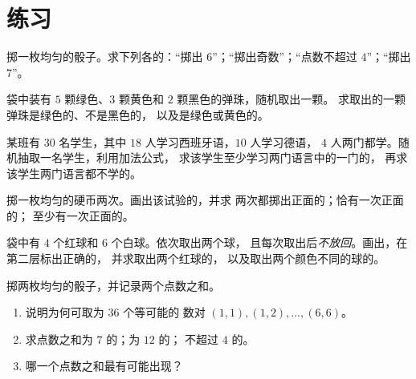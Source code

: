 \section{练习}

\begin{exercise}[$\star$]\label{exo:g10:proba:1}
掷一枚均匀的骰子。求下列各的：“掷出
$6$”；“掷出奇数”；“点数不超过 $4$”；“掷出
$7$”。
\end{exercise}

\begin{exercise}[$\star$]\label{exo:g10:proba:2}
袋中装有 $5$ 颗绿色、$3$ 颗黄色和 $2$ 颗黑色的弹珠，随机取出一颗。
求取出的一颗弹珠是绿色的、不是黑色的，
以及是绿色或黄色的。
\end{exercise}

\begin{exercise}[$\star$]\label{exo:g10:proba:3}
某班有 $30$ 名学生，其中 $18$ 人学习西班牙语，$10$ 人学习德语，
$4$ 人两门都学。随机抽取一名学生，利用加法公式，
求该学生至少学习两门语言中的一门的，
再求该学生两门语言都不学的。
\end{exercise}

\begin{exercise}[$\star$]\label{exo:g10:proba:4}
掷一枚均匀的硬币两次。画出该试验的，并求
两次都掷出正面的；恰有一次正面的；
至少有一次正面的。
\end{exercise}

\begin{exercise}[$\star\star$]\label{exo:g10:proba:5}
袋中有 $4$ 个红球和 $6$ 个白球。依次取出两个球，
且每次取出后\emph{不放回}。画出，在第二层标出正确的，
并求取出两个红球的，
以及取出两个颜色不同的球的。
\end{exercise}

\begin{exercise}[$\star\star$]\label{exo:g10:proba:6}
掷两枚均匀的骰子，并记录两个点数之和。
\begin{enumerate}
  \item 说明为何可取为 $36$ 个等可能的
        数对 $(1,1), (1,2), \dots, (6,6)$。
  \item 求点数之和为 $7$ 的；为 $12$ 的；
        不超过 $4$ 的。
  \item 哪一个点数之和最有可能出现？
\end{enumerate}
\end{exercise}

